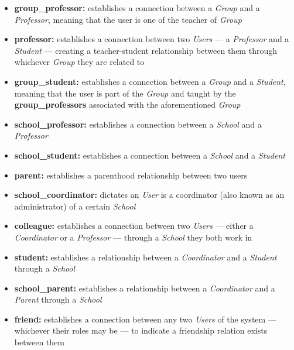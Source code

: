 \begin{itemize}
  \item \textbf{group\_professor:} establishes a connection between a \emph{Group} and a \emph{Professor}, meaning that the user is one of the teacher of \emph{Group}
  \item \textbf{professor:} establishes a connection between two \emph{Users} --- a \emph{Professor} and a \emph{Student} --- creating a teacher-student relationship between them through whichever \emph{Group} they are related to
  \item \textbf{group\_student:} establishes a connection between a \emph{Group} and a \emph{Student}, meaning that the user is part of the \emph{Group} and taught by the \textbf{group\_professors} associated with the aforementioned \emph{Group}
  \item \textbf{school\_professor:} establishes a connection between a \emph{School} and a \emph{Professor}
  \item \textbf{school\_student:} establishes a connection between a \emph{School} and a \emph{Student}
  \item \textbf{parent:} establishes a parenthood relationship between two users
  \item \textbf{school\_coordinator:} dictates an \emph{User} is a coordinator (also known as an administrator) of a certain \emph{School}
  \item \textbf{colleague:} establishes a connection between two \emph{Users} --- either a \emph{Coordinator} or a \emph{Professor} --- through a \emph{School} they both work in
  \item \textbf{student:} establishes a relationship between a \emph{Coordinator} and a \emph{Student} through a \emph{School}
  \item \textbf{school\_parent:} establishes a relationship between a \emph{Coordinator} and a \emph{Parent} through a \emph{School}
  \item \textbf{friend:} establishes a connection between any two \emph{Users} of the system --- whichever their roles may be --- to indicate a friendship relation exists between them
\end{itemize}

